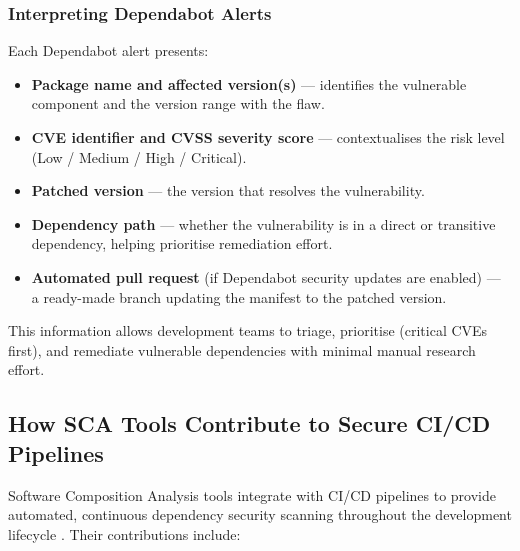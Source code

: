 \documentclass[12pt,a4paper]{article}
\begin{document}
\subsubsection*{Interpreting Dependabot Alerts}

Each Dependabot alert presents:
\begin{itemize}
  \item \textbf{Package name and affected version(s)} --- identifies the vulnerable
    component and the version range with the flaw.
  \item \textbf{CVE identifier and CVSS severity score} --- contextualises the risk level
    (Low / Medium / High / Critical).
  \item \textbf{Patched version} --- the version that resolves the vulnerability.
  \item \textbf{Dependency path} --- whether the vulnerability is in a direct or
    transitive dependency, helping prioritise remediation effort.
  \item \textbf{Automated pull request} (if Dependabot security updates are enabled) ---
    a ready-made branch updating the manifest to the patched version.
\end{itemize}

This information allows development teams to triage, prioritise (critical CVEs first), and
remediate vulnerable dependencies with minimal manual research effort.

\subsection{How SCA Tools Contribute to Secure CI/CD Pipelines}

Software Composition Analysis tools integrate with CI/CD pipelines to provide automated,
continuous dependency security scanning throughout the development lifecycle
\citep{owaspDC}. Their contributions include:
\end{document}
